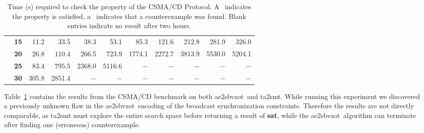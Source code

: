 \documentclass[a4paper,11pt]{report}
\newcommand*\cmark{\small\Checkmark}
\newcommand*{\xmark}{\small\XSolidBrush}
\theoremstyle{definition}
\newcommand{\aez}{ae2sbvzot}
\begin{document}
\begin{table}[t]
\begin{tabular}{
r  r  r
r  r  r
r  r  r
r  r
}
     & \textbf{15} & 11.2\cmark & 33.5\cmark & 38.3\cmark & 53.1\cmark & 85.3\cmark & 121.6\cmark & 212.8\cmark & 281.9\cmark & 326.0\cmark \\
     & \textbf{20} & 26.8\cmark & 110.4\cmark & 266.5\cmark & 723.9\cmark & 1774.1\cmark & 2272.7\cmark & 3813.9\cmark & 5530.0\cmark & 5204.1\cmark \\
     & \textbf{25} & 83.4\cmark & 795.5\cmark & 2368.0\cmark & 5116.6\cmark & $-$ & $-$ & $-$ & $-$ & $-$ \\
     & \textbf{30} & 305.8\cmark & 2851.4\cmark & $-$ & $-$ & $-$ & $-$ & $-$ & $-$ & $-$ \\
   \bottomrule
  \cline{1-11}
\end{tabular}
\caption {Time (s) required to check the property of the CSMA/CD Protocol. A \cmark\
  indicates the property is satisfied, a \xmark\ indicates that a counterexample
  was found. Blank entries indicate no result after two hours.}
\label{table:csmacd-results}
\end{table}

Table~\ref{table:csmacd-results} contains the results from the CSMA/CD benchmark
on both \aez\ and ta2smt. While running this experiment we discovered a
previously unknown flaw in the \aez\ encoding of the broadcast synchronization
constraints. Therefore the results are not directly comparable, as ta2smt must
explore the entire search space before returning a result of \textbf{sat}, while
the \aez\ algorithm can terminate after finding one (erroneous) counterexample.
\end{document}
